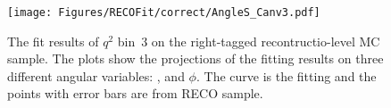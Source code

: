 

\begin{figure}[!hbt]
  \centering
  \texttt{[image: Figures/RECOFit/correct/AngleS\_Canv3.pdf]}
  \caption{The fit results of $q^2$ bin~3 on the right-tagged recontructio-level MC sample.
    The plots show the projections of the fitting results on three different angular variables: \cTL, \cTK and $\phi$.
    The curve is the fitting and the points with error bars are from RECO sample.}
  \label{fig:rtag-bin3}
\end{figure}



